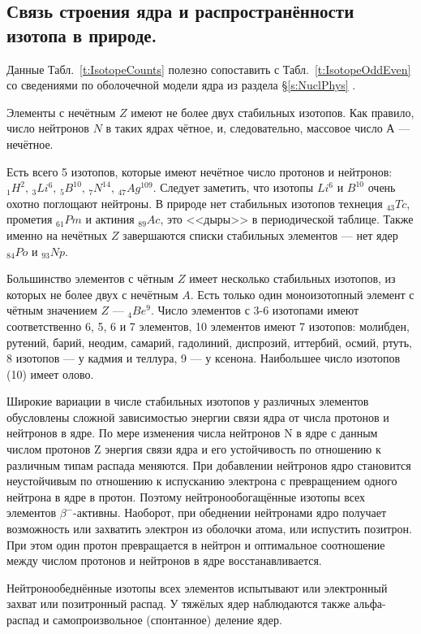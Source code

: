 \documentclass[a5paper,openany]{book}
\begin{document}
\subsection{Связь строения ядра и распространённости изотопа в природе.}
Данные Табл.~\ref{t:IsotopeCounts} полезно сопоставить с Табл.~\ref{t:IsotopeOddEven} со сведениями по оболочечной модели ядра из раздела \S\ref{s:NuclPhys}   \cite{NuclPhys, Bekman}.

Элементы с нечётным $Z$ имеют не более двух стабильных изотопов. Как правило, число нейтронов $N$ в
таких ядрах чётное, и, следовательно, массовое число $А$ --- нечётное. 

Есть всего 5 изотопов, которые имеют нечётное число протонов и нейтронов:  $_{1}H^{2},   \,  _{3}Li^{6},  \,  _{5}B^{10},   \, _{7}N^{14},  \,  _{47}Ag^{109}$. Следует заметить, что изотопы $Li^{6}$ и $B^{10}$ очень охотно поглощают нейтроны. В природе нет стабильных изотопов технеция $_{43}Tc$, прометия $_{61}Pm$ и актиния $_{89}Ac$, это <<дыры>> в периодической таблице. Также именно на нечётных $Z$ завершаются списки стабильных элементов --- нет ядер $_{84}Po$ и $_{93}Np$.

Большинство элементов с чётным $Z$ имеет несколько стабильных изотопов, из которых не более двух с нечётным $A$. 
Есть только один моноизотопный элемент с чётным значением $Z$ --- $_{4}Be^{9}$.
Число элементов с 3-6 изотопами имеют соответственно 6, 5, 6 и 7 элементов,  10 элементов имеют 7 изотопов: молибден, рутений, барий, неодим, самарий, гадолиний, диспрозий, иттербий, осмий, ртуть, 8 изотопов --- у кадмия и теллура, 9 --- у ксенона.  Наибольшее число изотопов (10) имеет олово.

Широкие вариации в числе стабильных изотопов у различных элементов обусловлены сложной
зависимостью энергии связи ядра от числа протонов и нейтронов в ядре. По мере изменения числа нейтронов
N в ядре с данным числом протонов Z энергия связи ядра и его устойчивость по отношению к различным
типам распада меняются. При добавлении нейтронов ядро становится неустойчивым по отношению к
испусканию электрона с превращением одного нейтрона в ядре в протон. Поэтому нейтронообогащённые
изотопы всех элементов $\beta^{-}$-активны. Наоборот, при обеднении нейтронами ядро получает возможность или
захватить электрон из оболочки атома, или испустить позитрон. 
При этом один протон превращается в
нейтрон и оптимальное соотношение между числом протонов и нейтронов в ядре восстанавливается.

Нейтронообеднённые изотопы всех элементов испытывают или электронный захват или позитронный распад.
У тяжёлых ядер наблюдаются также альфа-распад и самопроизвольное (спонтанное) деление ядер.
\end{document}

